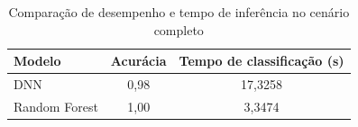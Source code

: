 \begin{table}[H]
  \centering
  \small
  \label{tab:comparacao_completo}
  \begin{tabular}{lcc}
    \hline
    \textbf{Modelo} & \textbf{Acurácia} & \textbf{Tempo de classificação (s)} \\ \hline
    DNN             & 0,98              & 17,3258                             \\
    Random Forest   & 1,00              & 3,3474                              \\ \hline
  \end{tabular}
  \caption{Comparação de desempenho e tempo de inferência no cenário completo}
\end{table}
